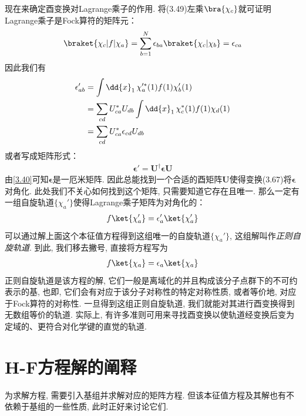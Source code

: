 现在来确定酉变换对Lagrange乘子的作用. 
将(3.49)左乘$\bra{\chi_c}$就可证明Lagrange乘子是Fock算符的矩阵元：
\begin{align}
	\braket{\chi_c|f|\chi_a} = \sum_{b=1}^{N}\epsilon_{ba}\braket{\chi_c|\chi_b} = \epsilon_{ca}
\end{align}
因此我们有
\begin{align}
	\epsilon_{ab}' & = \int\dd{x}_1\,\chi_a^{\prime *}(1)f(1)\chi_b'(1)\notag\\
	& = \sum_{cd}U_{ca}^* U_{db}\int\dd{x}_1\,\chi_c^*(1)f(1)\chi_d(1)\notag\\
	& = \sum_{cd}U_{ca}^* \epsilon_{cd} U_{db}
\end{align}
或者写成矩阵形式：
\begin{align}
	\bm{\epsilon}' = \mathbf{U}^\dagger \bm{\epsilon}\mathbf{U}
\end{align}
由\autoref{3.40}可知$\bm{\epsilon}$是一厄米矩阵. 
因此总能找到一个合适的酉矩阵$\mathbf{U}$使得变换(3.67)将$\bm{\epsilon}$对角化. 
此处我们不关心如何找到这个矩阵, 
只需要知道它存在且唯一. 
那么一定有一组自旋轨道$\{\chi_a'\}$使得Lagrange乘子矩阵为对角化的：
\begin{align}
	f\ket{\chi_a'} = \epsilon_a'\ket{\chi_a'}
\end{align}
可以通过解上面这个本征值方程得到这组唯一的自旋轨道$\{\chi_a'\}$, 
这组解叫作\emph{正则自旋轨道}. 
到此, 
我们移去撇号, 
直接将\hft 方程写为
\begin{align}
	f\ket{\chi_a} = \epsilon_a\ket{\chi_a}
\end{align}
正则自旋轨道是该方程的解, 
它们一般是离域化的并且构成该分子点群下的不可约表示的基, 
也即, 
它们会有对应于该分子对称性的特定对称性质, 
或者等价地, 
对应于Fock算符的对称性. 
一旦得到这组正则自旋轨道, 
我们就能对其进行酉变换得到无数组等价的轨道. 
实际上, 
有许多准则可用来寻找酉变换以使轨道经变换后变为定域的、更符合对化学键的直觉的轨道.

\section{H-F方程解的阐释}
为求解\hft 方程, 
需要引入基组并求解对应的矩阵方程. 
但该本征值方程及其解也有不依赖于基组的一些性质, 
此时正好来讨论它们.

